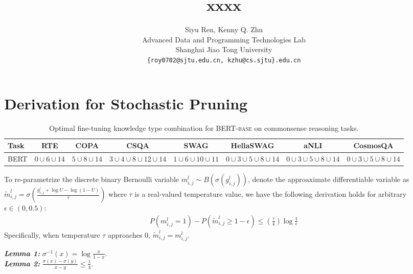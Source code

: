 \documentclass[11pt,a4paper]{article}
\title{xxxx}
\author{Siyu Ren, Kenny Q. Zhu \\
	Advanced Data and Programming Technologies Lab \\
	Shanghai Jiao Tong University \\
	\texttt{\{roy0702@sjtu.edu.cn, kzhu@cs.sjtu\}.edu.cn} \\
}
\date{}
\begin{document}
\appendix
\section{Derivation for Stochastic Pruning}
\begin{table*}[tb!]
	\centering
	\scriptsize
	\begin{tabular}{l|ccccccc}
		\toprule
		\textbf{Task} & \textbf{RTE}&\textbf{COPA} &\textbf{CSQA} &\textbf{SWAG} &\textbf{HellaSWAG} &\textbf{aNLI} &\textbf{CosmosQA} \\
		\midrule
		\textsc{BERT} &$0\cup 6\cup 14$ &$5\cup 8\cup 14$ &$3\cup 4\cup 8\cup 12\cup 14$ &$1\cup 6\cup 10\cup 11$  &$0\cup 3\cup 5\cup 8\cup 14$ &$0\cup 3\cup 5\cup 8\cup 14$ &$0\cup 3\cup 5\cup 8\cup 14$ \\
		\bottomrule
	\end{tabular}
	\caption{Optimal fine-tuning knowledge type combination for \textsc{BERT-base} on commonsense reasoning tasks.}
	\label{table:finetuning}
\end{table*}
\label{ap:derivation}
To re-parametrize the discrete binary Bernoulli variable $m_{i,j}^l\sim B(\sigma(g_{i,j}^l))$, denote the approaximate differentiable variable as $\tilde{m}_{i,j}^l=\sigma(\frac{g_{i,j}^l+\log{U}-\log{(1-U)}}{\tau})$ where $\tau$ is a real-valued temperature value, we have the following derivation holds for arbitrary $\epsilon \in (0, 0.5)$:
\begin{align}
	P(m_{i,j}^l=1) - P(\tilde{m}_{i,j}^l\geq 1-\epsilon) \leq (\frac{\tau}{4})\log{\frac{1}{\epsilon}}
\end{align}
Specifically, when temperature $\tau$ approaches $0$, $\tilde{m}_{i,j}^l = m_{i,j}^l$.

\noindent
\textit{\textbf{Lemma 1:}} $\sigma^{-1}(x)=\log{\frac{x}{1-x}}$.\\
\noindent
\textit{\textbf{Lemma 2:}} $\frac{\sigma(x)-\sigma(y)}{x-y} \leq \frac{1}{4}$.
\end{document}
